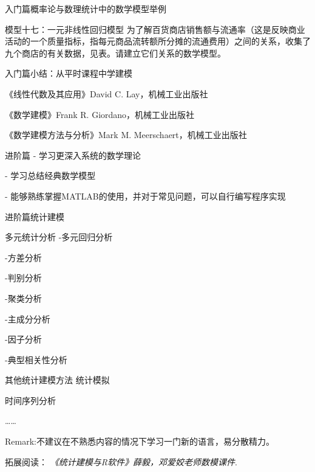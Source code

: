\documentclass{beamer}
\begin{document}
\begin{frame}{入门篇}{概率论与数理统计中的数学模型举例}
\begin{block}{模型十七：一元非线性回归模型}
为了解百货商店销售额与流通率（这是反映商业活动的一个质量指标，指每元商品流转额所分摊的流通费用）之间的关系，收集了九个商店的有关数据，见表。请建立它们关系的数学模型。

\begin{table}[h]
\centering
{}
\caption{数据}
\label{table2}
\end{table}

\end{block}
\end{frame}

\begin{frame}{入门篇}{小结：从平时课程中学建模}

《线性代数及其应用》David C. Lay，机械工业出版社

《数学建模》Frank R. Giordano，机械工业出版社

《数学建模方法与分析》Mark M. Meerschaert，机械工业出版社

\end{frame}

\begin{frame}{进阶篇}
- 学习更深入系统的数学理论

- 学习总结经典数学模型

- 能够熟练掌握MATLAB的使用，并对于常见问题，可以自行编写程序实现
\end{frame}

\begin{frame}{进阶篇}{统计建模}
\begin{block}{多元统计分析}
-多元回归分析

-方差分析

-判别分析

-聚类分析

-主成分分析

-因子分析

-典型相关性分析
\end{block}
\begin{block}{其他统计建模方法}
统计模拟

时间序列分析

……
\end{block}


\footnotesize Remark:不建议在不熟悉内容的情况下学习一门新的语言，易分散精力。

\footnotesize 拓展阅读：
\emph{《统计建模与R软件》薛毅，邓爱姣老师数模课件}.
\end{frame}
\end{document}
